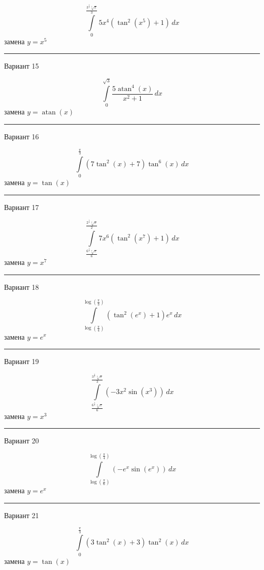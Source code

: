 \documentclass[11pt]{report}
\begin{document}
$$\int\limits_{0}^{\frac{3^{\frac{4}{5}} \sqrt[5]{\pi}}{3}} 5 x^{4} \left(\tan^{2}{\left(x^{5} \right)} + 1\right)\, dx$$
замена $y = x^{5}$



\rule{\textwidth}{.2mm}

Вариант 15

$$\int\limits_{0}^{\sqrt{3}} \frac{5 \operatorname{atan}^{4}{\left(x \right)}}{x^{2} + 1}\, dx$$
замена $y = \operatorname{atan}{\left(x \right)}$



\rule{\textwidth}{.2mm}

Вариант 16

$$\int\limits_{0}^{\frac{\pi}{3}} \left(7 \tan^{2}{\left(x \right)} + 7\right) \tan^{6}{\left(x \right)}\, dx$$
замена $y = \tan{\left(x \right)}$



\rule{\textwidth}{.2mm}

Вариант 17

$$\int\limits_{\frac{6^{\frac{6}{7}} \sqrt[7]{\pi}}{6}}^{\frac{2^{\frac{5}{7}} \sqrt[7]{\pi}}{2}} 7 x^{6} \left(\tan^{2}{\left(x^{7} \right)} + 1\right)\, dx$$
замена $y = x^{7}$



\rule{\textwidth}{.2mm}

Вариант 18

$$\int\limits_{\log{\left(\frac{\pi}{4} \right)}}^{\log{\left(\frac{\pi}{3} \right)}} \left(\tan^{2}{\left(e^{x} \right)} + 1\right) e^{x}\, dx$$
замена $y = e^{x}$



\rule{\textwidth}{.2mm}

Вариант 19

$$\int\limits_{\frac{6^{\frac{2}{3}} \sqrt[3]{\pi}}{6}}^{\frac{3^{\frac{2}{3}} \sqrt[3]{\pi}}{3}} \left(- 3 x^{2} \sin{\left(x^{3} \right)}\right)\, dx$$
замена $y = x^{3}$



\rule{\textwidth}{.2mm}

Вариант 20

$$\int\limits_{\log{\left(\frac{\pi}{6} \right)}}^{\log{\left(\frac{\pi}{4} \right)}} \left(- e^{x} \sin{\left(e^{x} \right)}\right)\, dx$$
замена $y = e^{x}$



\rule{\textwidth}{.2mm}

Вариант 21

$$\int\limits_{0}^{\frac{\pi}{3}} \left(3 \tan^{2}{\left(x \right)} + 3\right) \tan^{2}{\left(x \right)}\, dx$$
замена $y = \tan{\left(x \right)}$
\end{document}

